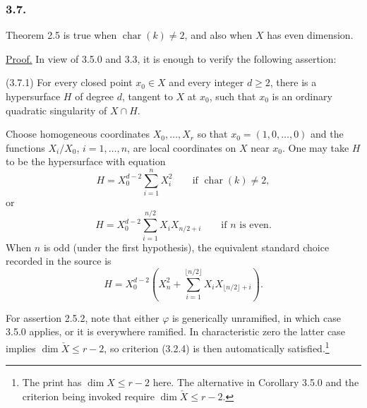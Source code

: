 \subsubsection*{3.7.}
Theorem 2.5 is true when $\operatorname{char}(k)\ne2$, and also when
$X$ has even dimension.

\noindent\underline{Proof.}
In view of 3.5.0 and 3.3, it is enough to verify the following
assertion:

\medskip
\noindent(3.7.1) For every closed point $x_0\in X$ and every integer
$d\geq2$, there is a hypersurface $H$ of degree $d$, tangent to $X$
at $x_0$, such that $x_0$ is an ordinary quadratic singularity of
$X\cap H$.

Choose homogeneous coordinates $X_0,\ldots,X_r$ so that
$x_0=(1,0,\ldots,0)$ and the functions $X_i/X_0$, $i=1,\ldots,n$,
are local coordinates on $X$ near $x_0$.  One may take $H$ to be the
hypersurface with equation
\begin{equation}\tag{3.7.1.1}
H=X_0^{d-2}\sum_{i=1}^{n}X_i^2
\qquad\text{if }\operatorname{char}(k)\ne2,
\end{equation}
or
\begin{equation}\tag{3.7.1.2}
H=X_0^{d-2}\sum_{i=1}^{n/2}X_iX_{n/2+i}
\qquad\text{if }n\text{ is even}.
\end{equation}
When $n$ is odd (under the first hypothesis), the equivalent standard
choice recorded in the source is
\begin{equation}\tag{3.7.1.3}
H=X_0^{d-2}
\left(X_n^2+
\sum_{i=1}^{\lfloor n/2\rfloor}
X_iX_{\lfloor n/2\rfloor+i}\right).
\end{equation}

For assertion 2.5.2, note that either $\varphi$ is generically
unramified, in which case 3.5.0 applies, or it is everywhere ramified.
In characteristic zero the latter case implies
$\dim\check X\leq r-2$, so criterion (3.2.4) is then automatically
satisfied.\footnote{The print has $\dim X\leq r-2$ here.  The
alternative in Corollary 3.5.0 and the criterion being invoked require
$\dim\check X\leq r-2$.}
